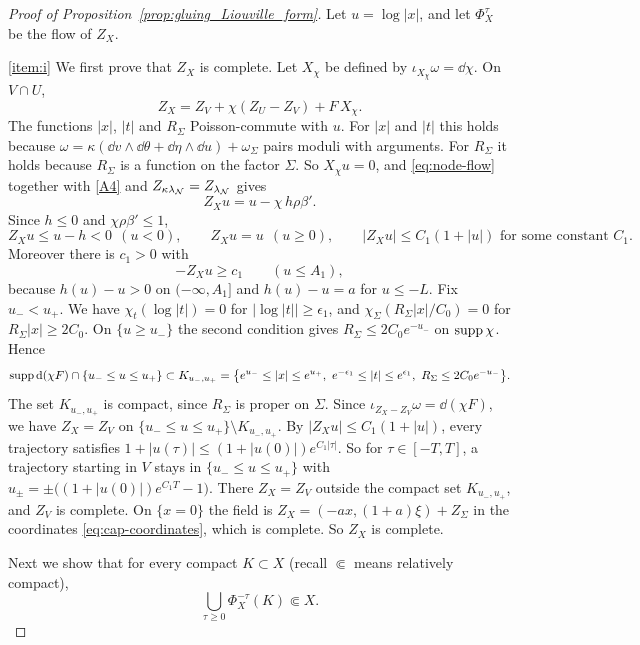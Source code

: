 \documentclass[12pt, letter]{amsart}
\theoremstyle{definition}
\begin{document}
\begin{proof}[Proof of Proposition~\ref{prop:gluing_Liouville_form}]
Let $u=\log|x|$, and let $\Phi_X^\tau$ be the flow of $Z_X$.

\ref{item:i} We first prove that $Z_X$ is complete.
Let $X_\chi$ be defined by $\iota_{X_\chi}\omega=\dd\chi$.
On $V\cap U$,
\[
 Z_X=Z_V+\chi(Z_U-Z_V)+F\,X_\chi .
\]
The functions $|x|$, $|t|$ and $R_\Sigma$ Poisson-commute with $u$.
For $|x|$ and $|t|$ this holds because $\omega=\kappa(\dd v\wedge \dd\theta+\dd\eta\wedge \dd u)+\omega_\Sigma$ pairs moduli with arguments.
For $R_\Sigma$ it holds because $R_\Sigma$ is a function on the factor $\Sigma$.
So $X_\chi u=0$, and \eqref{eq:node-flow} together with \ref{A4} and $Z_{\kappa\lambda_{\mathcal{N}}}=Z_{\lambda_{\mathcal{N}}}$ gives
\begin{equation}\label{eq:attachment-monotone}
 Z_Xu=u-\chi\,h\rho\beta' .
\end{equation}
Since $h\le0$ and $\chi\rho\beta'\le1$,
\[
 Z_Xu\le u-h<0\ \ (u<0),\qquad Z_Xu=u\ \ (u\ge0),\qquad |Z_Xu|\le C_1(1+|u|) \text{ for some constant } C_1.
\]
Moreover there is $c_1>0$ with
\begin{equation}\label{eq:attachment-speed}
 -Z_Xu\ge c_1\qquad(u\le A_1),
\end{equation}
because $h(u)-u>0$ on $(-\infty,A_1]$ and $h(u)-u=a$ for $u\le-L$.
Fix $u_-<u_+$.
We have $\chi_t(\log|t|)=0$ for $|\log|t||\ge\epsilon_1$, and $\chi_\Sigma(R_\Sigma|x|/C_0)=0$ for $R_\Sigma|x|\ge2C_0$.
On $\{u\ge u_-\}$ the second condition gives $R_\Sigma\le2C_0e^{-u_-}$ on $\operatorname{supp}\chi$.
Hence
\[
 \operatorname{supp} \mathrm{d}(\chi F)\cap\{u_-\le u\le u_+\}\subset
 K_{u_-,u_+}=\bigl\{e^{u_-}\le|x|\le e^{u_+},\ e^{-\epsilon_1}\le|t|\le e^{\epsilon_1},\ R_\Sigma\le2C_0e^{-u_-}\bigr\}.
\]
The set $K_{u_-,u_+}$ is compact, since $R_\Sigma$ is proper on $\Sigma$.
Since $\iota_{Z_X-Z_V}\omega=\dd(\chi F)$, we have $Z_X=Z_V$ on $\{u_-\le u\le u_+\}\setminus K_{u_-,u_+}$.
By $|Z_Xu|\le C_1(1+|u|)$, every trajectory satisfies $1+|u(\tau)|\le(1+|u(0)|)e^{C_1|\tau|}$.
So for $\tau\in[-T,T]$, a trajectory starting in $V$ stays in $\{u_-\le u\le u_+\}$ with $u_\pm=\pm\bigl((1+|u(0)|)e^{C_1T}-1\bigr)$.
There $Z_X=Z_V$ outside the compact set $K_{u_-,u_+}$, and $Z_V$ is complete.
On $\{x=0\}$ the field is $Z_X=(-ax,(1+a)\xi)+Z_\Sigma$ in the coordinates \eqref{eq:cap-coordinates}, which is complete.
So $Z_X$ is complete.

Next we show that for every compact $K\subset X$ (recall \( \Subset\) means relatively compact),
\begin{equation}\label{eq:attachment-saturation}
 \bigcup_{\tau\ge0}\Phi_X^{-\tau}(K)\Subset X.
\end{equation}


\end{proof}
\end{document}
